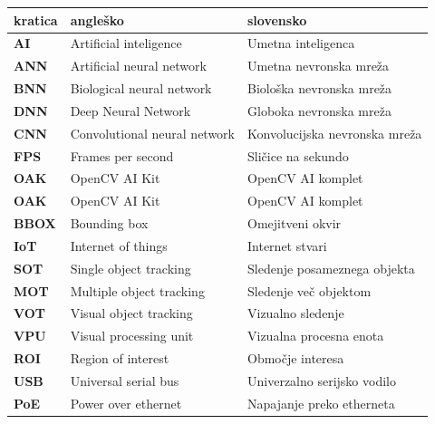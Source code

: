 \documentclass[a4paper,12pt,openright]{book}
\begin{document}
\noindent\begin{tabular}{p{}|p{}|p{}}    %
    {\bf kratica} & {\bf angleško}               & {\bf slovensko}               \\ \hline
    {\bf AI}      & Artificial inteligence       & Umetna inteligenca            \\
    {\bf ANN}     & Artificial neural network    & Umetna nevronska mreža        \\
    {\bf BNN}     & Biological neural network    & Biološka nevronska mreža      \\
    {\bf DNN}     & Deep Neural Network          & Globoka nevronska mreža       \\
    {\bf CNN}     & Convolutional neural network & Konvolucijska nevronska mreža \\
    {\bf FPS}     & Frames per second            & Sličice na sekundo            \\
    {\bf OAK}     & OpenCV AI Kit                & OpenCV AI komplet             \\
    {\bf OAK}     & OpenCV AI Kit                & OpenCV AI komplet             \\
    {\bf BBOX}    & Bounding box                 & Omejitveni okvir              \\
    {\bf IoT}     & Internet of things           & Internet stvari               \\
    {\bf SOT}     & Single object tracking       & Sledenje posameznega objekta  \\
    {\bf MOT}     & Multiple object tracking     & Sledenje več objektom         \\
    {\bf VOT}     & Visual object tracking       & Vizualno sledenje             \\
    {\bf VPU}     & Visual processing unit       & Vizualna procesna enota       \\
    {\bf ROI}     & Region of interest           & Območje interesa              \\
    {\bf USB}     & Universal serial bus         & Univerzalno serijsko vodilo   \\
    {\bf PoE}     & Power over ethernet          & Napajanje preko etherneta     \\

\end{tabular}
\end{document}
